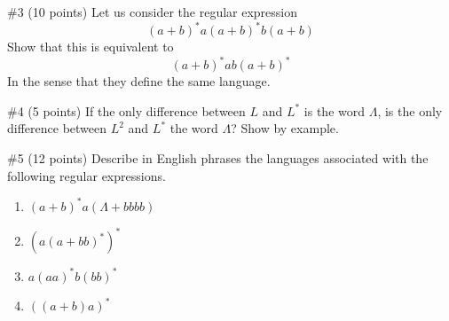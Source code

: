 \begin{problem}{\#3 (10 points)}
    Let us consider the regular expression
    \[(a+b)^*a(a+b)^*b(a+b)\]
    Show that this is equivalent to
    \[(a+b)^*ab(a+b)^*\]
    In the sense that they define the same language.
\end{problem}
\vspace{2em}
\begin{solution}

\end{solution}

\begin{problem}{\#4 (5 points)}
    If the only difference between \(L\) and \(L^*\) is the word \(\Lambda\), is the only difference between \(L^2\) and \(L^*\) the word \(\Lambda\)?
    Show by example.
\end{problem}
\vspace{2em}
\begin{solution}

\end{solution}

\begin{problem}{\#5 (12 points)}
    Describe in English phrases the languages associated with the following regular expressions.
    \begin{enumerate}[label=\alph*]
        \item \((a+b)^*a(\Lambda+bbbb)\)
        \item \((a(a+bb)^*)^*\)
        \item \(a(aa)^*b(bb)^*\)
        \item \(((a+b)a)^*\)
    \end{enumerate}
\end{problem}
\vspace{2em}
\begin{solution}
\end{solution}